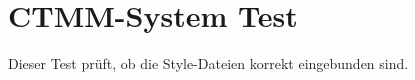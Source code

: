 \documentclass[a4paper,12pt]{article}
\begin{document}
\section*{CTMM-System Test}
\textcolor{ctmmBlue}{Dieser Test prüft, ob die Style-Dateien korrekt eingebunden sind.}

\ctmmTriggerLoop


\end{document}
